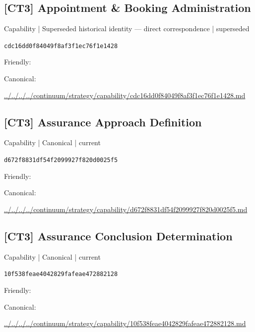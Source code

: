 \documentclass[10pt,a4paper]{article}
\begin{document}
\subsection*{[CT3] Appointment \& Booking Administration}
{\small Capability | Superseded historical identity — direct correspondence | superseded}\par
\texttt{cdc16dd0f84049f8af3f1ec76f1e1428}\par
Friendly: \par
Canonical: \par
{\footnotesize\url{../../../../continuum/strategy/capability/cdc16dd0f84049f8af3f1ec76f1e1428.md}}\par
\subsection*{[CT3] Assurance Approach Definition}
{\small Capability | Canonical | current}\par
\texttt{d672f8831df54f2099927f820d0025f5}\par
Friendly: \par
Canonical: \par
{\footnotesize\url{../../../../continuum/strategy/capability/d672f8831df54f2099927f820d0025f5.md}}\par
\subsection*{[CT3] Assurance Conclusion Determination}
{\small Capability | Canonical | current}\par
\texttt{10f538feae4042829fafeae472882128}\par
Friendly: \par
Canonical: \par
{\footnotesize\url{../../../../continuum/strategy/capability/10f538feae4042829fafeae472882128.md}}\par
\end{document}
